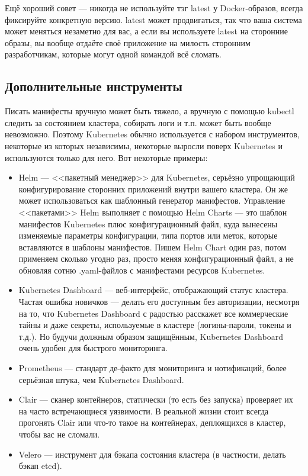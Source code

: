 \documentclass[a5paper]{article}
\begin{document}
Ещё хороший совет --- никогда не используйте тэг latest у Docker-образов, всегда фиксируйте конкретную версию. latest может продвигаться, так что ваша система может меняться незаметно для вас, а если вы используете latest на сторонние образы, вы вообще отдаёте своё приложение на милость сторонним разработчикам, которые могут одной командой всё сломать.

\subsection{Дополнительные инструменты}

Писать манифесты вручную может быть тяжело, а вручную с помощью kubectl следить за состоянием кластера, собирать логи и т.п. может быть вообще невозможно. Поэтому Kubernetes обычно используется с набором инструментов, некоторые из которых независимы, некоторые выросли поверх Kubernetes и используются только для него. Вот некоторые примеры:

\begin{itemize}
    \item Helm --- <<пакетный менеджер>> для Kubernetes, серьёзно упрощающий конфигурирование сторонних приложений внутри вашего кластера. Он же может использоваться как шаблонный генератор манифестов. Управление <<пакетами>> Helm выполняет с помощью Helm Charts --- это шаблон манифестов Kubernetes плюс конфигурационный файл, куда вынесены изменяемые параметры конфигурации, типа портов или меток, которые вставляются в шаблоны манифестов. Пишем Helm Chart один раз, потом применяем сколько угодно раз, просто меняя конфигурационный файл, а не обновляя сотню .yaml-файлов с манифестами ресурсов Kubernetes.
    \item Kubernetes Dashboard --- веб-интерфейс, отображающий статус кластера. Частая ошибка новичков --- делать его доступным без авторизации, несмотря на то, что Kubernetes Dashboard с радостью расскажет все коммерческие тайны и даже секреты, используемые в кластере (логины-пароли, токены и т.д.). Но будучи должным образом защищённым, Kubernetes Dashboard очень удобен для быстрого мониторинга.
    \item Prometheus --- стандарт де-факто для мониторинга и нотификаций, более серьёзная штука, чем Kubernetes Dashboard.
    \item Clair --- сканер контейнеров, статически (то есть без запуска) проверяет их на часто встречающиеся уязвимости. В реальной жизни стоит всегда прогонять Clair или что-то такое на контейнерах, деплоящихся в кластер, чтобы вас не сломали.
    \item Velero --- инструмент для бэкапа состояния кластера (в частности, делать бэкап etcd).
\end{itemize}
\end{document}
